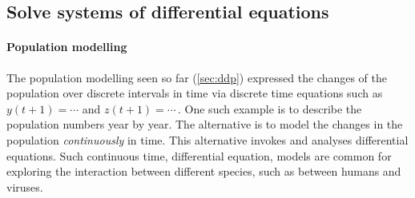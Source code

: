 \subsection{Solve systems of differential equations}
\label{sec:ssde}

\paragraph{Population modelling}
The population modelling seen so far (\autoref{sec:ddp}) expressed the changes of the population over discrete intervals in time via discrete time equations such as \(y(t+1)=\cdots\) and \(z(t+1)=\cdots\)\,.
One such example is to describe the population numbers year by year.
The alternative is to model the changes in the population \emph{continuously} in time.
This alternative invokes and analyses differential equations.
Such continuous time, differential equation, models are common for exploring the interaction between different species, such as between humans and viruses.

